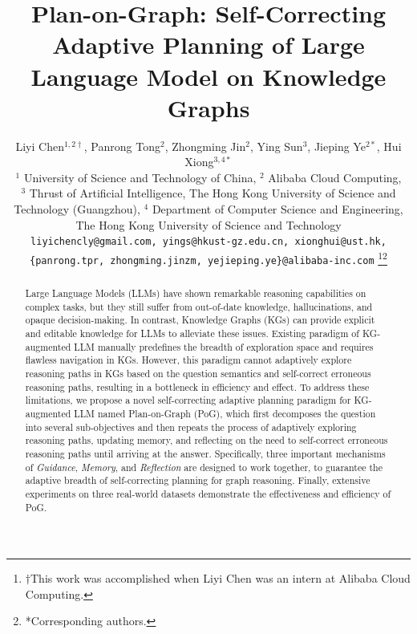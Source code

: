 \documentclass{article}
\title{Plan-on-Graph: Self-Correcting Adaptive Planning of Large Language Model on Knowledge Graphs}
\author{Liyi Chen$^{1, 2 \dagger}$, Panrong Tong$^{2}$, Zhongming Jin$^{2}$, Ying Sun$^{3}$, Jieping Ye$^{2*}$, Hui Xiong$^{3, 4*}$ \\
$^{1}$ University of Science and Technology of China, 
$^{2}$ Alibaba Cloud Computing,\\
$^{3}$ Thrust of Artificial Intelligence, The Hong Kong University of Science and \\ Technology (Guangzhou), $^{4}$ Department of Computer Science and Engineering, \\The Hong Kong University of Science and Technology\\
\texttt{liyichencly@gmail.com, yings@hkust-gz.edu.cn, xionghui@ust.hk,}\\ \texttt{\{panrong.tpr, zhongming.jinzm, yejieping.ye\}@alibaba-inc.com}
\thanks{$\dagger$This work was accomplished when Liyi Chen was an intern at Alibaba Cloud Computing.}\thanks{*Corresponding authors.}}
\begin{document}
\maketitle


\begin{abstract}
Large Language Models (LLMs) have shown remarkable reasoning capabilities on complex tasks, but they still suffer from out-of-date knowledge, hallucinations, and opaque decision-making. 
In contrast, Knowledge Graphs (KGs) can provide explicit and editable knowledge for LLMs to alleviate these issues.
Existing paradigm of KG-augmented LLM manually predefines the breadth of exploration space and requires flawless navigation in KGs.
However, this paradigm cannot adaptively explore reasoning paths in KGs based on the question semantics and self-correct erroneous reasoning paths, resulting in a bottleneck in efficiency and effect.
To address these limitations, we propose a novel self-correcting adaptive planning paradigm for KG-augmented LLM named Plan-on-Graph (PoG), which first decomposes the question into several sub-objectives and then repeats the process of adaptively exploring reasoning paths, updating memory, and reflecting on the need to self-correct erroneous reasoning paths until arriving at the answer.
Specifically, three important mechanisms of \textit{Guidance}, \textit{Memory}, and \textit{Reflection} are designed to work together, to guarantee the adaptive breadth of self-correcting planning for graph reasoning. Finally, extensive experiments on three real-world datasets demonstrate the effectiveness and efficiency of PoG.


\end{abstract}
\end{document}
